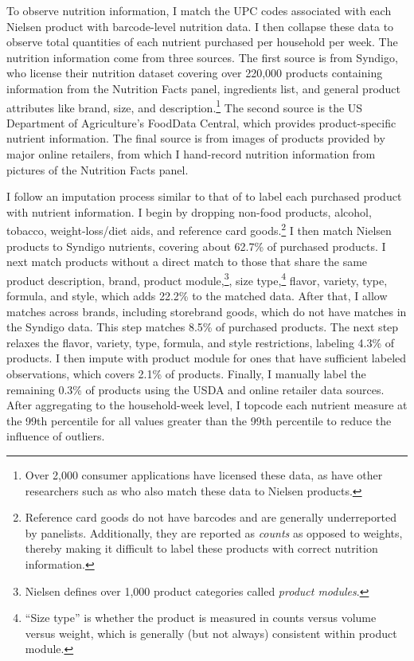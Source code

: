 \documentclass[12pt]{article}
\begin{document}
To observe nutrition information, I match the UPC codes associated with each Nielsen product with barcode-level nutrition data. I then collapse these data to observe total quantities of each nutrient purchased per household per week. The nutrition information come from three sources. The first source is from Syndigo, who license their nutrition dataset covering over 220,000 products containing information from the Nutrition Facts panel, ingredients list, and general product attributes like brand, size, and description.\footnote{Over 2,000 consumer applications have licensed these data, as have other researchers such as \textcite{dubois2014prices} who also match these data to Nielsen products.} The second source is the US Department of Agriculture's FoodData Central, which provides product-specific nutrient information. The final source is from images of products provided by major online retailers, from which I hand-record nutrition information from pictures of the Nutrition Facts panel.

I follow an imputation process similar to that of \textcite{dubois2014prices} to label each purchased product with nutrient information. I begin by dropping non-food products, alcohol, tobacco, weight-loss/diet aids, and reference card goods.\footnote{Reference card goods do not have barcodes and are generally underreported by panelists. Additionally, they are reported as \textit{counts} as opposed to weights, thereby making it difficult to label these products with correct nutrition information.} %
I then match Nielsen products to Syndigo nutrients, covering about 62.7\% of purchased products. I next match products without a direct match to those that share the same product description, brand, product module,\footnote{Nielsen defines over 1,000 product categories called \textit{product modules}.}, size type,\footnote{``Size type'' is whether the product is measured in counts versus volume versus weight, which is generally (but not always) consistent within product module.} flavor, variety, type, formula, and style, which adds 22.2\% to the matched data. After that, I allow matches across brands, including storebrand goods, which do not have matches in the Syndigo data. This step matches 8.5\% of purchased products. The next step relaxes the flavor, variety, type, formula, and style restrictions, labeling 4.3\% of products. I then impute with product module for ones that have sufficient labeled observations, which covers 2.1\% of products. Finally, I manually label the remaining 0.3\% of products using the USDA and online retailer data sources. After aggregating to the household-week level, I topcode each nutrient measure at the 99th percentile for all values greater than the 99th percentile to reduce the influence of outliers.  %
\end{document}
